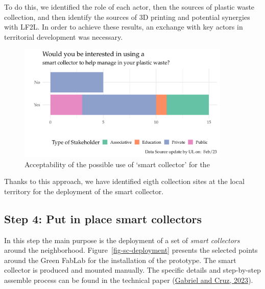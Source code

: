 \documentclass[
  11pt,
]{article}
\begin{document}
To do this, we identified the role of each actor, then the sources of
plastic waste collection, and then identify the sources of 3D printing
and potential synergies with LF2L. In order to achieve these results, an
exchange with key actors in territorial development was necessary.

\begin{figure}[H]

{\centering \includegraphics[width=0.9\textwidth,height=\textheight]{figures/fedoua/Acceptability-02.pdf}

}

\caption{\label{fig-acceptability-02}Acceptability of the possible use
of `smart collector' for the}

\end{figure}

Thanks to this approach, we have identified eigth collection sites at
the local territory for the deployment of the smart collector.

\hypertarget{step-4-put-in-place-smart-collectors}{%
\subsection{Step 4: Put in place smart
collectors}\label{step-4-put-in-place-smart-collectors}}

In this step the main purpose is the deployment of a set of \emph{smart
collectors} around the neighborhood. Figure~\ref{fig-sc-deployment}
presents the selected points around the Green FabLab for the
installation of the prototype. The smart collector is produced and
mounted manually. The specific details and step-by-step assemble process
can be found in the technical paper
(\protect\hyperlink{ref-gabriel2023}{Gabriel and Cruz, 2023}).
\end{document}
